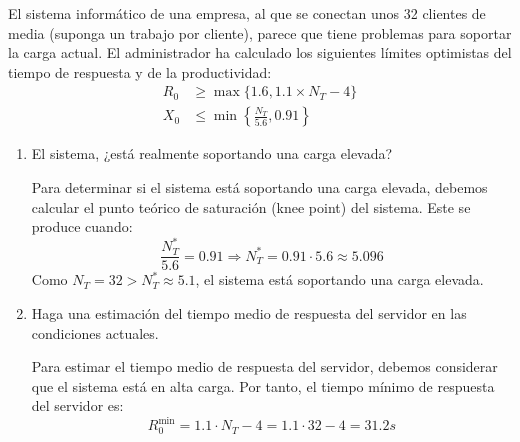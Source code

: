 \begin{ejercicio}\label{ej:5.23}
    El sistema informático de una empresa, al que se conectan unos 32 clientes de media (suponga un trabajo por cliente), parece que tiene problemas para soportar la carga actual. El administrador ha calculado los siguientes límites optimistas del tiempo de respuesta y de la productividad:
    \begin{align*}
        R_0 &\geq \max\{1.6, 1.1 \times N_T - 4\} \\
        X_0 &\leq \min\left\{\frac{N_T}{5.6}, 0.91\right\}
    \end{align*}
    \begin{enumerate}
        \item El sistema, ¿está realmente soportando una carga elevada?
        
        Para determinar si el sistema está soportando una carga elevada, debemos calcular el punto teórico de saturación (knee point) del sistema. Este se produce cuando:
        \begin{equation*}
            \frac{N_T^*}{5.6} = 0.91
            \Longrightarrow N_T^* = 0.91 \cdot 5.6 \approx 5.096
        \end{equation*}
        Como $N_T = 32 > N_T^* \approx 5.1$, el sistema está soportando una carga elevada.
        \item Haga una estimación del tiempo medio de respuesta del servidor en las condiciones actuales.
        
        Para estimar el tiempo medio de respuesta del servidor, debemos considerar que el sistema está en alta carga. Por tanto, el tiempo mínimo de respuesta del servidor es:
        \begin{equation*}
            R_0^{\text{min}} = 1.1 \cdot N_T - 4 = 1.1 \cdot 32 - 4 = 31.2 \unit{s}
        \end{equation*}
    \end{enumerate}
\end{ejercicio}
\begin{comment}
\solucion
    \begin{enumerate}
        \item La carga es elevada porque el punto teórico de saturación (knee point) está situado en torno a los 5 clientes y en el sistema hay 32 clientes conectados.
        \item El tiempo medio de respuesta del servidor estará situado ligeramente por encima de los 31.2 segundos (parte derecha del límite optimista).
    \end{enumerate}
\end{comment}

